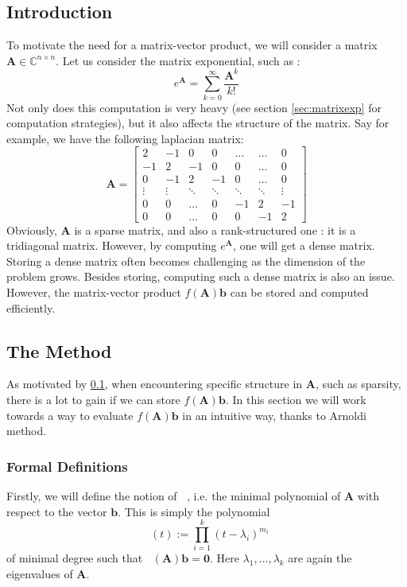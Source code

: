 \documentclass[11pt]{article}
\DeclareMathOperator{\phiAb}{\phi_{\mathbf{A},\mathbf{b}}}
\numberwithin{equation}{section}
\begin{document}
\subsection{Introduction}\label{sec:fabintro}
To motivate the need for a matrix-vector product, we will consider a matrix $\mathbf{A}\in\mathbb{C}^{n\times n}$. Let us consider the matrix exponential, such as :
\begin{equation}
    e^{\mathbf{A}} = \sum_{k=0}^\infty \frac{\mathbf{A}^k}{k!}
\end{equation}
Not only does this computation is very heavy (see section \ref{sec:matrixexp} for computation strategies), but it also affects the structure of the matrix. Say for example, we have the following laplacian matrix: 
\begin{equation*}
    \mathbf{A} = \begin{bmatrix}
        2 & -1 & 0 & 0 & \dots &  \dots & 0 \\
        -1 & 2 & -1 & 0 & 0 & \dots & 0 \\
        0 & -1 & 2 & -1 & 0 & \dots & 0 \\
        \vdots & \vdots & \ddots & \ddots & \ddots & \ddots & \vdots \\
        0 & 0 & \dots & 0 & -1 & 2 & -1 \\
        0 & 0 & \dots & 0 & 0 & -1 & 2
    \end{bmatrix}
\end{equation*}
Obviously, $\mathbf{A}$ is a sparse matrix, and also a rank-structured one : it is a tridiagonal matrix. However, by computing $e^{\mathbf{A}}$, one will get a dense matrix. Storing a dense matrix often becomes challenging as the dimension of the problem grows. Besides storing, computing such a dense matrix is also an issue. However, the matrix-vector product $f(\mathbf{A})\mathbf{b}$ can be stored and computed efficiently.

\subsection{The Method}
As motivated by \ref{sec:fabintro}, when encountering specific structure in $\mathbf{A}$, such as sparsity, there is a lot to gain if we can store $f(\mathbf{A})\mathbf{b}$. In this section we will work towards a way to evaluate $f(\mathbf{A})\mathbf{b}$ in an intuitive way, thanks to Arnoldi method.

\subsubsection{Formal Definitions}
Firstly, we will define the notion of $\phiAb$, i.e. the minimal polynomial of $\mathbf{A}$ with respect to the vector $\mathbf{b}$. This is simply the polynomial
\begin{equation}\label{eq:minPolyAb}
\phiAb(t):= \prod_{i=1}^{k}(t-\lambda_i)^{m_i}
\end{equation}
of minimal degree such that $\phiAb(\mathbf{A})\mathbf{b}=\mathbf{0}$. Here $\lambda_1,\ldots,\lambda_k$ are again the eigenvalues of $\mathbf{A}$.
\end{document}
